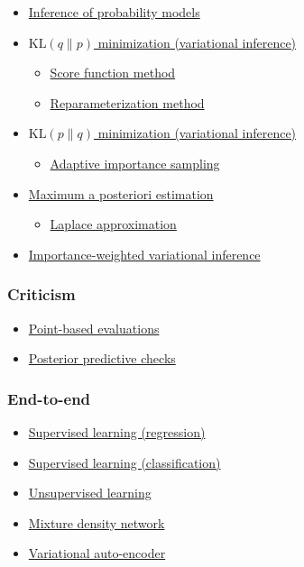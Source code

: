 \begin{itemize}
  \item \href{tut_inference.html}{Inference of probability models}
  \item \href{tut_KLqp.html}{$\text{KL}(q\|p)$ minimization (variational
  inference)}
  \begin{itemize}
    \item \href{tut_KLqp_score.html}{Score function method}
    \item \href{tut_KLqp_reparam.html}{Reparameterization method}
  \end{itemize}
  \item \href{tut_KLpq.html}{$\text{KL}(p\|q)$ minimization (variational
  inference)}
  \begin{itemize}
    \item \href{tut_KLpq_ais.html}{Adaptive importance sampling}
  \end{itemize}
  \item \href{tut_MAP.html}{Maximum a posteriori estimation}
  \begin{itemize}
    \item \href{tut_MAP_Laplace.html}{Laplace approximation}
  \end{itemize}
  \item \href{#}{Importance-weighted variational inference}
\end{itemize}

\subsubsection{Criticism}

\begin{itemize}
  \item \href{tut_point_eval.html}{Point-based evaluations}
  \item \href{tut_PPC.html}{Posterior predictive checks}
\end{itemize}

\subsubsection{End-to-end}

\begin{itemize}
  \item \href{tut_supervised_regression.html}{Supervised learning (regression)}
  \item \href{tut_supervised_classification.html}{Supervised learning (classification)}
  \item \href{tut_unsupervised.html}{Unsupervised learning}
  \item \href{#}{Mixture density network}
  \item \href{#}{Variational auto-encoder}
\end{itemize}

